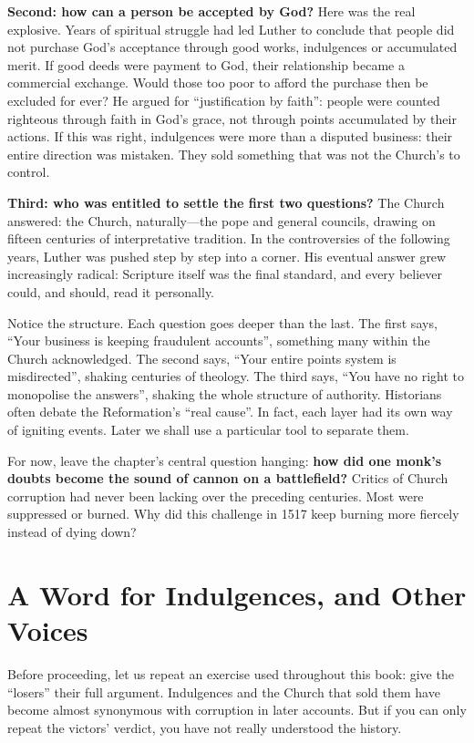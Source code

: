 \textbf{Second: how can a person be accepted by God?} Here was the real explosive. Years of spiritual struggle had led Luther to conclude that people did not purchase God's acceptance through good works, indulgences or accumulated merit. If good deeds were payment to God, their relationship became a commercial exchange. Would those too poor to afford the purchase then be excluded for ever? He argued for ``justification by faith'': people were counted righteous through faith in God's grace, not through points accumulated by their actions. If this was right, indulgences were more than a disputed business: their entire direction was mistaken. They sold something that was not the Church's to control.

\textbf{Third: who was entitled to settle the first two questions?} The Church answered: the Church, naturally---the pope and general councils, drawing on fifteen centuries of interpretative tradition. In the controversies of the following years, Luther was pushed step by step into a corner. His eventual answer grew increasingly radical: Scripture itself was the final standard, and every believer could, and should, read it personally.

Notice the structure. Each question goes deeper than the last. The first says, ``Your business is keeping fraudulent accounts'', something many within the Church acknowledged. The second says, ``Your entire points system is misdirected'', shaking centuries of theology. The third says, ``You have no right to monopolise the answers'', shaking the whole structure of authority. Historians often debate the Reformation's ``real cause''. In fact, each layer had its own way of igniting events. Later we shall use a particular tool to separate them.

For now, leave the chapter's central question hanging: \textbf{how did one monk's doubts become the sound of cannon on a battlefield?} Critics of Church corruption had never been lacking over the preceding centuries. Most were suppressed or burned. Why did this challenge in 1517 keep burning more fiercely instead of dying down?

\section[Other Voices]{A Word for Indulgences, and Other Voices}
Before proceeding, let us repeat an exercise used throughout this book: give the ``losers'' their full argument. Indulgences and the Church that sold them have become almost synonymous with corruption in later accounts. But if you can only repeat the victors' verdict, you have not really understood the history.

